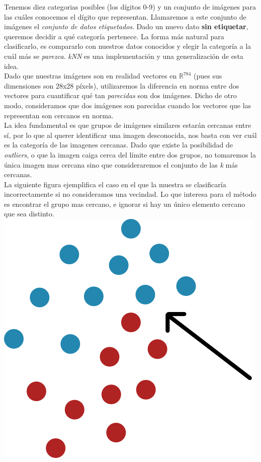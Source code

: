 Tenemos diez categorias posibles (los dígitos 0-9) y un conjunto de imágenes para las cuáles conocemos el dígito que representan. Llamaremos a este conjunto de imágenes el \textit{conjunto de datos etiquetados}. Dado un nuevo dato \textbf{sin etiquetar}, queremos decidir a qué categoría pertenece. La forma más natural para clasificarlo, es compararlo con nuestros datos conocidos y elegir la categoría a la cuál más se \textit{parezca}. \textit{kNN} es una implementación y una generalización de esta idea. \\

Dado que nuestras imágenes son en realidad vectores en $\mathbb{R}^{784}$ (pues sus dimensiones son 28x28 píxels), utilizaremos la diferencia en norma entre dos vectores para cuantificar qué tan \textit{parecidas} son dos imágenes. Dicho de otro modo, consideramos que dos imágenes son parecidas cuando los vectores que las representan son cercanos en norma. \\

La idea fundamental es que grupos de imágenes similares estarán cercanas entre sí, por lo que al querer identificar una imagen desconocida, nos basta con ver cuál es la categoría de las imagenes cercanas. Dado que existe la posibilidad de \textit{outliers}, o que la imagen caiga cerca del límite entre dos grupos, no tomaremos la única imagen mas cercana sino que consideraremos el conjunto de las \textit{k} más cercanas. \\

La siguiente figura ejemplifica el caso en el que la muestra se clasificaría incorrectamente si no consideramos una vecindad. Lo que interesa para el método es encontrar el grupo mas cercano, e ignorar si hay un único elemento cercano que sea distinto. \\

{\centering
    \includegraphics[scale=0.60]{informe/imagenes/knn/ejemploCluster.png} \\
}
$ $\newline

